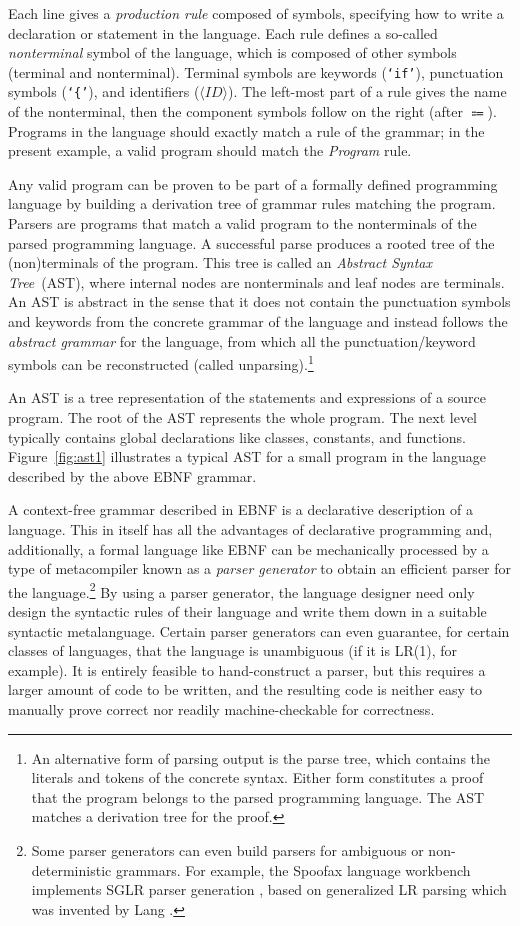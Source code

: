 \documentclass[10pt, twoside, openright]{book}
\newcommand{\figref}[1]{Figure~\ref{#1}}
\begin{document}
\noindent
Each line gives a \emph{production rule} composed of symbols, specifying how to write a declaration or statement in
the language.
Each rule defines a so-called \emph{nonterminal} symbol of the language, which
is composed of other symbols (terminal and nonterminal).
Terminal symbols are keywords (\texttt{\lq{}if\rq}), punctuation symbols (\texttt{\lq\{\rq}), and identifiers ($\langle\textit{ID}\rangle$).
The left-most part of a rule gives the name of the nonterminal, then the component symbols
follow on the right (after $\Coloneqq$).
Programs in the language should exactly match a rule of the grammar;
in the present example, a valid program should match the \emph{Program} rule.

Any valid program can be proven to be part of a formally defined programming language by building
a derivation tree of grammar rules matching the program.
Parsers are programs that match a valid program to the nonterminals of the parsed programming
language.
A successful parse produces a rooted tree of the (non)terminals
of the program.  This tree is called an \emph{Abstract Syntax Tree}~(AST),
where internal nodes are nonterminals and leaf nodes are terminals.
An AST is abstract in the sense that it does not contain the punctuation symbols
and keywords from the concrete grammar of the language and instead follows the
\emph{abstract grammar} for the language, from which all the punctuation/keyword symbols can be
reconstructed (called unparsing).\footnote{%
An alternative form of parsing output is the parse tree, which
contains the literals and tokens of the concrete syntax. Either form constitutes a proof that the
program belongs to the parsed programming language. The AST matches a derivation tree for the proof.}

An AST is a tree representation of the statements and
expressions of a source program.  The root of the AST represents the whole program. The
next level typically contains global declarations like classes, constants, and functions.
\figref{fig:ast1} illustrates a typical AST for a small
program in the language described by the above EBNF grammar.

A context-free grammar described in EBNF is a declarative description of a language. This
in itself has all the advantages of declarative programming and, additionally, a formal language
like EBNF can be mechanically processed by a type of metacompiler known as a \emph{parser generator}
to obtain an efficient parser for the language.\footnote{Some parser generators
can even build parsers for ambiguous or non-deterministic grammars. For example, the Spoofax
language workbench implements SGLR parser generation \cite{Kats2010}, based on generalized LR parsing
which was invented by Lang
\cite{Lang1974}.} By using a parser generator, the language designer need only
design the syntactic rules of their language and write them down in a suitable syntactic metalanguage.
Certain parser generators can even guarantee, for certain classes of languages, that the language
is unambiguous (if it is LR(1), for example).
It is entirely feasible to hand-construct a parser, but this requires a larger amount of
code to be written,
and the resulting code is neither easy to manually prove correct nor readily machine-checkable
for correctness.
\end{document}
